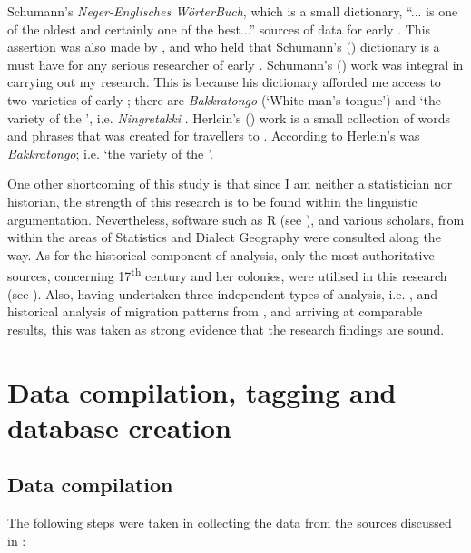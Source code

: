 Schumann's \emph{Neger-Englisches W{\"o}rterBuch}, which is a small dictionary, ``... is one of the oldest and certainly one of the best...'' sources of data for early  \citep[1]{Arends89}. This assertion was also made by \citet{Kramp83}, and  \citet{Bruyn95} who held that Schumann's  (\citeyear{Schumann83}) dictionary is a must have for any serious researcher of early . Schumann's (\citeyear{Schumann83}) work was integral in carrying out my research. This is because his dictionary afforded me access to two varieties of early ; there are \textit{Bakkratongo} (`White man's tongue') and `the variety of the ', i.e. \textit{Ningretakki} \citep{Schumann83}. Herlein's (\citeyear{Herlein18}) work is a small collection of words and phrases that was created for travellers to . According to \citep{Arends95} Herlein's  was \textit{Bakkratongo}; i.e. `the variety of the '.

One other shortcoming of this study is that since I am neither a statistician nor historian, the strength of this research is to be found within the linguistic argumentation. Nevertheless, software such as R (see ), and various scholars, from within the areas of Statistics and Dialect Geography were consulted along the way. As for the historical component of analysis, only the most authoritative sources, concerning 17\textsuperscript{th} century  and her colonies, were utilised in this research (see  ). Also, having undertaken three independent types of analysis, i.e. ,  and historical analysis of migration patterns from , and arriving at comparable results, this was taken as strong evidence that the research findings are sound.

\section{Data compilation, tagging and database creation} \label{3.3}
\subsection{Data compilation} \label{3.3.1}
The following steps were taken in collecting the data from the sources discussed in  :

